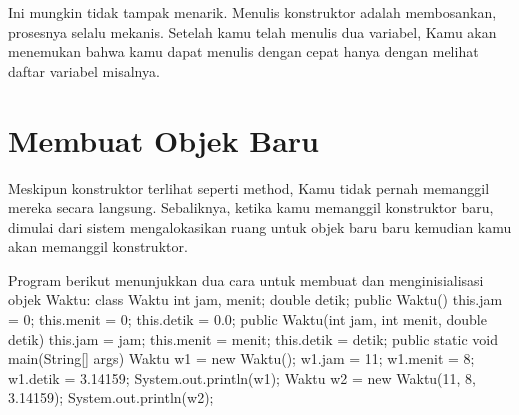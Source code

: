 Ini mungkin tidak tampak menarik. Menulis konstruktor adalah membosankan, prosesnya selalu mekanis. Setelah kamu telah menulis dua variabel, Kamu akan menemukan bahwa kamu dapat menulis dengan cepat hanya dengan melihat daftar variabel misalnya.

\section{Membuat Objek Baru}

Meskipun konstruktor terlihat seperti method, Kamu tidak pernah memanggil mereka secara langsung. Sebaliknya, ketika kamu memanggil konstruktor baru, dimulai dari sistem mengalokasikan ruang untuk objek baru baru kemudian kamu akan memanggil konstruktor.

Program berikut menunjukkan dua cara untuk membuat dan menginisialisasi objek Waktu:
\newline
class Waktu \textbraceleft \newline
	int jam, menit; \newline
	double detik; \newline
\newline	
	public Waktu()\textbraceleft \newline
		this.jam = 0; \newline
		this.menit = 0; \newline
		this.detik = 0.0; \newline
	\textbraceright \newline
\newline
	public Waktu(int jam, int menit, double detik)\textbraceleft \newline
	this.jam = jam; \newline
	this.menit = menit; \newline
	this.detik = detik; \newline
	\textbraceright \newline
\newline
	public static void main(String[] args)\textbraceleft \newline
	Waktu w1 = new Waktu(); \newline
	w1.jam = 11; \newline
	w1.menit = 8; \newline
	w1.detik = 3.14159; \newline
	System.out.println(w1); \newline
\newline
	Waktu w2 = new Waktu(11, 8, 3.14159); \newline
	System.out.println(w2); \newline
	\textbraceright \newline
\textbraceright

